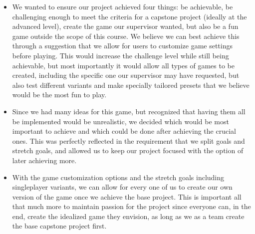 \documentclass{article}
\begin{document}
\begin{enumerate}
	\begin{itemize}
		\item We wanted to ensure our project achieved four things: be achievable, be challenging enough to meet the criteria for a capstone project (ideally at the advanced level), create the game our supervisor wanted, but also be a fun game outside the scope of this course. We believe we can best achieve this through a suggestion that we allow for users to customize game settings before playing. This would increase the challenge level while still being achievable, but most importantly it would allow all types of games to be created, including the specific one our supervisor may have requested, but also test different variants and make specially tailored presets that we believe would be the most fun to play.
		\item Since we had many ideas for this game, but recognized that having them all be implemented would be unrealistic, we decided which would be most important to achieve and which could be done after achieving the crucial ones. This was perfectly reflected in the requirement that we split goals and stretch goals, and allowed us to keep our project focused with the option of later achieving more.
		\item With the game customization options and the stretch goals including singleplayer variants, we can allow for every one of us to create our own version of the game once we achieve the base project. This is important all that much more to maintain passion for the project since everyone can, in the end, create the idealized game they envision, as long as we as a team create the base capstone project first.
	\end{itemize}    
    
\end{enumerate}  
\end{document}
